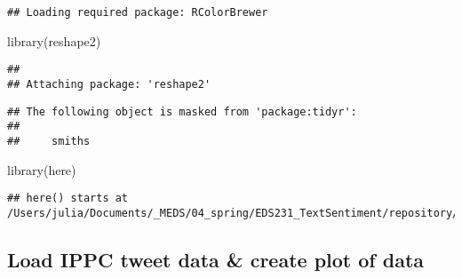 \documentclass[
]{article}
\newenvironment{Shaded}{\begin{snugshade}}{\end{snugshade}}
\newcommand{\AttributeTok}[1]{\textcolor[rgb]{0.77,0.63,0.00}{#1}}
\newcommand{\CommentTok}[1]{\textcolor[rgb]{0.56,0.35,0.01}{\textit{#1}}}
\newcommand{\DecValTok}[1]{\textcolor[rgb]{0.00,0.00,0.81}{#1}}
\newcommand{\FunctionTok}[1]{\textcolor[rgb]{0.00,0.00,0.00}{#1}}
\newcommand{\NormalTok}[1]{#1}
\newcommand{\OtherTok}[1]{\textcolor[rgb]{0.56,0.35,0.01}{#1}}
\newcommand{\SpecialCharTok}[1]{\textcolor[rgb]{0.00,0.00,0.00}{#1}}
\newcommand{\StringTok}[1]{\textcolor[rgb]{0.31,0.60,0.02}{#1}}
\begin{document}
\begin{verbatim}
## Loading required package: RColorBrewer
\end{verbatim}

\begin{Shaded}
\begin{Highlighting}[]
\FunctionTok{library}\NormalTok{(reshape2)}
\end{Highlighting}
\end{Shaded}

\begin{verbatim}
## 
## Attaching package: 'reshape2'
\end{verbatim}

\begin{verbatim}
## The following object is masked from 'package:tidyr':
## 
##     smiths
\end{verbatim}

\begin{Shaded}
\begin{Highlighting}[]
\FunctionTok{library}\NormalTok{(here)}
\end{Highlighting}
\end{Shaded}

\begin{verbatim}
## here() starts at /Users/julia/Documents/_MEDS/04_spring/EDS231_TextSentiment/repository/EDS231_TextSentimentAnalysis
\end{verbatim}

\hypertarget{load-ippc-tweet-data-create-plot-of-data}{%
\subsection{Load IPPC tweet data \& create plot of
data}\label{load-ippc-tweet-data-create-plot-of-data}}

\begin{Shaded}
\end{Shaded}
\end{document}
